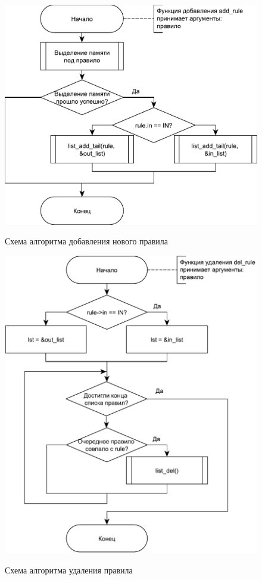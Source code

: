 \begin{figure}[h!]
	\begin{center}
		{\includegraphics[scale = 0.6]{img/add_rule.pdf}}
		\caption{Схема алгоритма добавления нового правила}
		\label{fig7:image}
	\end{center}
\end{figure}

\begin{figure}[h!]
	\begin{center}
		{\includegraphics[scale = 0.55]{img/del_rule.pdf}}
		\caption{Схема алгоритма удаления правила}
		\label{fig8:image}
	\end{center}
\end{figure}

